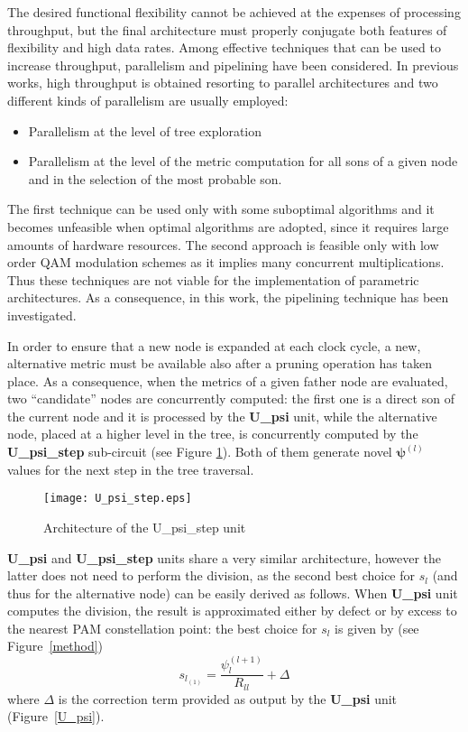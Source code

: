 \documentclass[12pt,onecolumn,draftclsnofoot]{IEEEtran}
\begin{document}
The desired functional flexibility cannot be achieved at the
expenses of processing throughput, but the final architecture must
properly conjugate both features of flexibility and high data rates.
Among effective techniques that can be used to increase throughput,
parallelism and pipelining have been considered. In previous
works, high throughput is obtained resorting to
parallel architectures and two different kinds of parallelism are
usually  employed:
\begin{itemize}
\item Parallelism at the level of tree exploration
\item Parallelism at the level of the metric computation
      for all sons of a given node and in the
      selection of the most probable son.
\end{itemize}
 The first technique can be used only with some suboptimal algorithms \cite{Kbest}
and it becomes unfeasible when optimal algorithms are adopted,
since it requires large amounts of hardware resources.
The second approach
is feasible only with low order QAM modulation schemes as it implies many
concurrent multiplications. Thus these techniques are not viable for the implementation of parametric architectures.
As a consequence, in this work,
the pipelining technique has been investigated.

In order to ensure that a new node is expanded at each clock cycle,
a new, alternative metric must be
available also after a pruning operation has taken place. As a
consequence, when the metrics of a given father node are evaluated, two
``candidate'' nodes are concurrently computed: the first one is a direct son
of the current node and it is processed by the \textbf{U\_psi} unit,
while the alternative node, placed at a higher level in the tree, 
is concurrently computed by the 
\textbf{U\_psi\_step} sub-circuit (see Figure \ref{U_psi_step_block}). Both of 
them generate novel $\boldsymbol{\psi}^{(l)}$ values for the next step in the tree traversal.
\begin{figure}[t!]
    \begin{center}
    \texttt{[image: U\_psi\_step.eps]} \caption{Architecture of the U\_psi\_step unit}
    \label{U_psi_step_block}
    \end{center}
\end{figure}

\textbf{U\_psi} and \textbf{U\_psi\_step} units share a very similar architecture,
however the latter does not need to perform the division, as the second best choice for $s_l$
(and thus for the alternative node)
can be easily derived as follows. When \textbf{U\_psi} unit computes the division, the result is 
approximated either by defect or by excess to the nearest PAM constellation point:
the best choice for $s_l$ is given by (see Figure~\ref{method})
\begin{equation}
s_{l_{(1)}} = \frac{\psi_l^{(l+1)}}{R_{ll}} + \Delta
\label{delta_def}
\end{equation}
\noindent where $\Delta$ is the correction term provided as output by the 
\textbf{U\_psi} unit (Figure~\ref{U_psi}).
\end{document}
